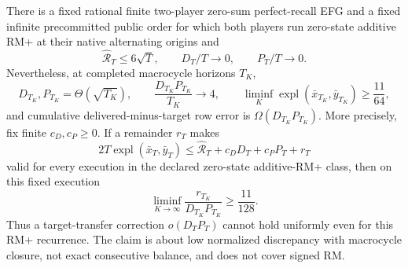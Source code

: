 \begin{proposition}
\label{prop:app-discrepancy-path-necessity}
There is a fixed rational finite two-player zero-sum perfect-recall EFG and a
fixed infinite precommitted public order for which both players run
zero-state additive RM+ at their native alternating origins and
\begin{equation}
\widehat{\mathcal R}_T\le6\sqrt T,\qquad
D_T/T\to0,\qquad P_T/T\to0.
\label{eq:app-rmplus-necessity-global}
\end{equation}
Nevertheless, at completed macrocycle horizons $T_K$,
\begin{equation}
D_{T_K},P_{T_K}=\Theta(\sqrt{T_K}),\qquad
\frac{D_{T_K}P_{T_K}}{T_K}\to4,\qquad
\liminf_K\operatorname{expl}(\bar x_{T_K},\bar y_{T_K})\ge\frac{11}{64},
\label{eq:app-rmplus-necessity-endpoints}
\end{equation}
and cumulative delivered-minus-target row error is $\Omega(D_{T_K}P_{T_K})$.
More precisely, fix finite $c_D,c_P\ge0$.  If a remainder $r_T$ makes
\begin{equation}
2T\operatorname{expl}(\bar x_T,\bar y_T)
\le \widehat{\mathcal R}_T+c_DD_T+c_PP_T+r_T
\label{eq:app-rmplus-remainder-form}
\end{equation}
valid for every execution in the declared zero-state additive-RM+ class, then
on this fixed execution
\begin{equation}
\liminf_{K\to\infty}
\frac{r_{T_K}}{D_{T_K}P_{T_K}}\ge\frac{11}{128}.
\label{eq:app-rmplus-remainder-lower}
\end{equation}
Thus a target-transfer correction $o(D_TP_T)$ cannot hold uniformly even for
this RM+ recurrence.  The claim is about low normalized discrepancy with
macrocycle closure, not exact consecutive balance, and does not cover signed
RM.
\end{proposition}

